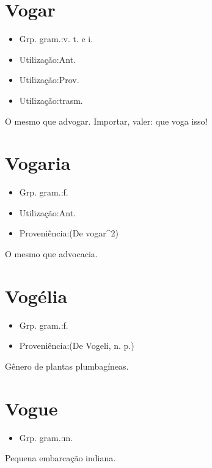 \documentclass{article}
\begin{document}
\section{Vogar}
\begin{itemize}
\item {Grp. gram.:v. t.  e  i.}
\end{itemize}
\begin{itemize}
\item {Utilização:Ant.}
\end{itemize}
\begin{itemize}
\item {Utilização:Prov.}
\end{itemize}
\begin{itemize}
\item {Utilização:trasm.}
\end{itemize}
O mesmo que \textunderscore advogar\textunderscore .
Importar, valer: \textunderscore que voga isso\textunderscore !
\section{Vogaria}
\begin{itemize}
\item {Grp. gram.:f.}
\end{itemize}
\begin{itemize}
\item {Utilização:Ant.}
\end{itemize}
\begin{itemize}
\item {Proveniência:(De \textunderscore vogar\textunderscore ^2)}
\end{itemize}
O mesmo que \textunderscore advocacia\textunderscore .
\section{Vogélia}
\begin{itemize}
\item {Grp. gram.:f.}
\end{itemize}
\begin{itemize}
\item {Proveniência:(De \textunderscore Vogeli\textunderscore , n. p.)}
\end{itemize}
Gênero de plantas plumbagíneas.
\section{Vogue}
\begin{itemize}
\item {Grp. gram.:m.}
\end{itemize}
Pequena embarcação indiana.
\end{document}
